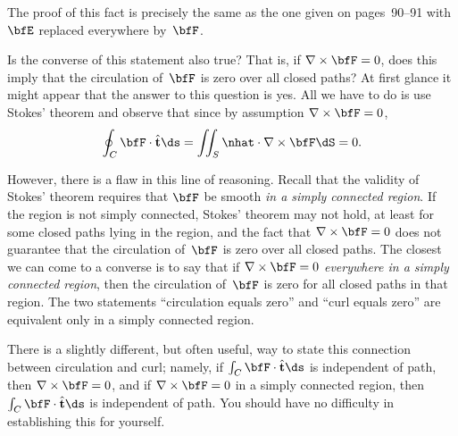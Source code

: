 The proof of this fact is precisely the same as the one given on
pages~90--91 with $\bfE$ replaced everywhere by~$\bfF$.

Is the converse of this statement also true?  That is, if
$\nabla\times\bfF=0$, does this imply that the circulation of~$\bfF$ is
zero over all closed paths?  At first glance it might appear that the
answer to this question is yes.  All we have to do is use Stokes'
theorem and observe that since by assumption
$\nabla\times\bfF=0$,
\[
  \oint_C\bfF\cdot\hat{\mathbf{t}}\ds
  = \iint_S \nhat\cdot\nabla\times\bfF\dS = 0.
\]

However, there is a flaw in this line of reasoning.  Recall that the
validity of Stokes' theorem requires that $\bfF$ be smooth \emph{in a
simply connected region}.  If the region is not simply connected,
Stokes' theorem may not hold, at least for some closed paths lying in
the region, and the fact that $\nabla\times\bfF=0$ does not guarantee
that the circulation of~$\bfF$ is zero over all closed paths.  The
closest we can come to a converse is to say that if
$\nabla\times\bfF=0$ \emph{everywhere in a simply connected region},
then the circulation of~$\bfF$ is zero for all closed paths in that
region.  The two statements ``circulation equals zero'' and ``curl
equals zero'' are equivalent only in a simply connected region.

There is a slightly different, but often useful, way to state this
connection between circulation and curl; namely, if
$\int_C\bfF\cdot\hat{\mathbf{t}}\ds$ is independent of path, then
$\nabla\times\bfF=0$, and if $\nabla\times\bfF=0$ in a simply
connected region, then $\int_C\bfF\cdot\hat{\mathbf{t}}\ds$ is
independent of path.  You should have no difficulty in establishing this
for yourself.


